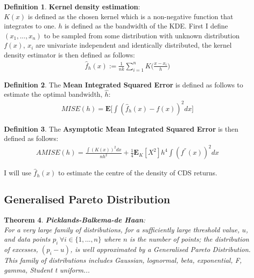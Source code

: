 \documentclass{report}
\theoremstyle{plain}
\newtheorem{thm}{Theorem}[chapter] %
\theoremstyle{definition}
\newtheorem{defn}[thm]{Definition} %
\begin{document}
\begin{defn}
	\textbf{Kernel density estimation}:\\
	$K(x)$ is defined as the chosen kernel which is a non-negative function that integrates to one. $h$ is defined as the bandwidth of the KDE. First I define $(x_1,...,x_n)$ to be sampled from some distribution with unknown distribution $f(x)$, $x_i$ are univariate independent and identically distributed, the kernel density estimator is then defined as follows: 
	\begin{align*}
	\hat{f}_h(x) := \frac{1}{nk} \sum_{i=1}^{n}K\Big(\frac{x - x_i}{h}\Big)
	\end{align*}
\end{defn}

\begin{defn}
	The \textbf{Mean Integrated Squared Error} is defined as follows to estimate the optimal bandwidth, $\hat{h}$:
	\begin{align*}
	MISE(h) = \mathbf{E}\Big[ \int (\hat{f}_h(x) - f(x))^2 dx \Big]
	\end{align*}
\end{defn}	
\begin{defn}
	The \textbf{Asymptotic Mean Integrated Squared Error} is then defined as follows:
	\begin{align*}
	AMISE(h) = \frac{\int (K(x))^2 dx}{nh^2} + \frac{1}{4}\mathbf{E}_K[X^2]h^4\int (f^{''}(x))^2 dx
	\end{align*}
\end{defn}

I will use $\hat{f}_h(x)$ to estimate the centre of the density of CDS returns.

\subsection{Generalised Pareto Distribution}

\begin{thm}
	\textbf{Picklands-Balkema-de Haan}:\\
	For a very large family of distributions, for a sufficiently large threshold value, $u$, and data points $p_i \ \forall i \in \{1,...,n\}$ where $n$ is the number of points; the distribution of excesses, $(p_i - u)$, is well approximated by a \emph{Generalised Pareto Distribution}.\\
	This family of distributions includes Gaussian, lognormal, beta, exponential, F, gamma, Student t uniform...
\end{thm}
\end{document}
